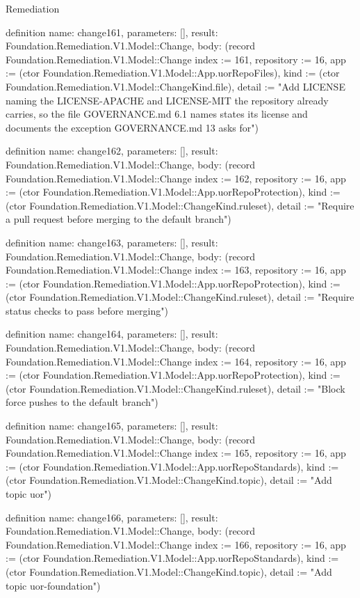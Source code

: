 \begin{lexlean}{Remediation}
\begin{semanticmodule}
definition{
  name: change161,
  parameters: [],
  result: Foundation.Remediation.V1.Model::Change,
  body: (record Foundation.Remediation.V1.Model::Change {index := 161, repository := 16, app := (ctor Foundation.Remediation.V1.Model::App.uorRepoFiles), kind := (ctor Foundation.Remediation.V1.Model::ChangeKind.file), detail := "Add LICENSE naming the LICENSE-APACHE and LICENSE-MIT the repository already carries, so the file GOVERNANCE.md 6.1 names states its license and documents the exception GOVERNANCE.md 13 asks for"})
}

definition{
  name: change162,
  parameters: [],
  result: Foundation.Remediation.V1.Model::Change,
  body: (record Foundation.Remediation.V1.Model::Change {index := 162, repository := 16, app := (ctor Foundation.Remediation.V1.Model::App.uorRepoProtection), kind := (ctor Foundation.Remediation.V1.Model::ChangeKind.ruleset), detail := "Require a pull request before merging to the default branch"})
}

definition{
  name: change163,
  parameters: [],
  result: Foundation.Remediation.V1.Model::Change,
  body: (record Foundation.Remediation.V1.Model::Change {index := 163, repository := 16, app := (ctor Foundation.Remediation.V1.Model::App.uorRepoProtection), kind := (ctor Foundation.Remediation.V1.Model::ChangeKind.ruleset), detail := "Require status checks to pass before merging"})
}

definition{
  name: change164,
  parameters: [],
  result: Foundation.Remediation.V1.Model::Change,
  body: (record Foundation.Remediation.V1.Model::Change {index := 164, repository := 16, app := (ctor Foundation.Remediation.V1.Model::App.uorRepoProtection), kind := (ctor Foundation.Remediation.V1.Model::ChangeKind.ruleset), detail := "Block force pushes to the default branch"})
}

definition{
  name: change165,
  parameters: [],
  result: Foundation.Remediation.V1.Model::Change,
  body: (record Foundation.Remediation.V1.Model::Change {index := 165, repository := 16, app := (ctor Foundation.Remediation.V1.Model::App.uorRepoStandards), kind := (ctor Foundation.Remediation.V1.Model::ChangeKind.topic), detail := "Add topic uor"})
}

definition{
  name: change166,
  parameters: [],
  result: Foundation.Remediation.V1.Model::Change,
  body: (record Foundation.Remediation.V1.Model::Change {index := 166, repository := 16, app := (ctor Foundation.Remediation.V1.Model::App.uorRepoStandards), kind := (ctor Foundation.Remediation.V1.Model::ChangeKind.topic), detail := "Add topic uor-foundation"})
}


\end{semanticmodule}
\end{lexlean}
